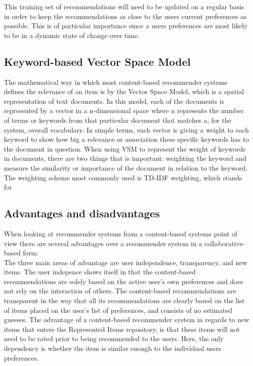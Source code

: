 This training set of recommendations will need to be updated on a regular basis in order to keep the recommendations as close to the users current preferences as possible. This is of particular importance since a users preferences are most likely to be in a dynamic state of change over time.


\subsection{Keyword-based Vector Space Model}
The mathematical way in which most content-based recommender systems defines the relevance of an item is by the Vector Space Model, which is a spatial representation of text documents. In this model, each of the documents is represented by a vector in a n-dimensional space where n represents the number of terms or keywords from that particular document that matches a, for the system, overall vocabulary. In simple terms, each vector is giving a weight to each keyword to show how big a relevance or association these specific keywords has to the document in question. 
When using VSM to represent the weight of keywords in documents, there are two things that is important: weighting the keyword and measure the similarity or importance of the document in relation to the keyword.
The weighting scheme most commonly used is TD-IDF weighting, which stands for 

\subsection{Advantages and disadvantages}
When looking at recommender systems from a content-based systems point of view there are several advantages over a recommender system in a collaborative-based form.\\

The three main areas of advantage are user independence, transparency, and new items.
The user indepence shows itself in that the content-based recommendations are solely based on the active user’s own preferences and does not rely on the interaction of others.
The content-based recommendations are transparent in the way that all its recommendations are clearly based on the list of items placed on the user’s list of preferences, and consists of no estimated guesses. The advantage of a content-based recommender system in regards to new items that enters the Represented Items repository, is that these items will not need to be rated prior to being recommended to the users. Here, the only dependency is whether the item is similar enough to the individual users preferences.\\

